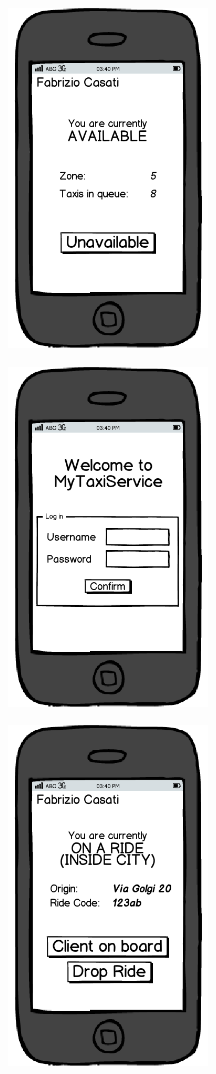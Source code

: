 \begin{center}
\includegraphics[width=150pt,keepaspectratio]{images/taxi_available.png}

\includegraphics[width=150pt,keepaspectratio]{images/taxi_login.png}

\includegraphics[width=150pt,keepaspectratio]{images/taxi_meeting.png}


\end{center}
